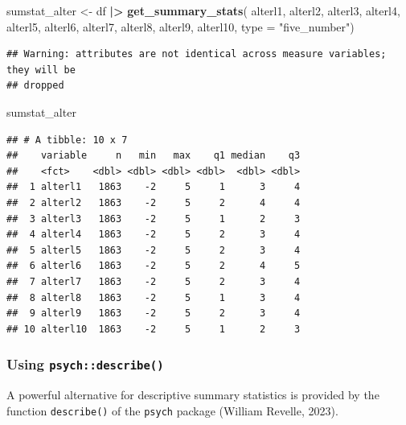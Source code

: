 \documentclass[
  doc]{apa6}
\newenvironment{Shaded}{\begin{snugshade}}{\end{snugshade}}
\newcommand{\AttributeTok}[1]{\textcolor[rgb]{0.13,0.29,0.53}{#1}}
\newcommand{\FunctionTok}[1]{\textcolor[rgb]{0.13,0.29,0.53}{\textbf{#1}}}
\newcommand{\NormalTok}[1]{#1}
\newcommand{\OtherTok}[1]{\textcolor[rgb]{0.56,0.35,0.01}{#1}}
\newcommand{\SpecialCharTok}[1]{\textcolor[rgb]{0.81,0.36,0.00}{\textbf{#1}}}
\newcommand{\StringTok}[1]{\textcolor[rgb]{0.31,0.60,0.02}{#1}}
\begin{document}
\begin{Shaded}
\begin{Highlighting}[]
\NormalTok{sumstat\_alter }\OtherTok{\textless{}{-}}\NormalTok{ df }\SpecialCharTok{|\textgreater{}} 
  \FunctionTok{get\_summary\_stats}\NormalTok{(}
\NormalTok{    alterl1, }
\NormalTok{    alterl2, }
\NormalTok{    alterl3, }
\NormalTok{    alterl4, }
\NormalTok{    alterl5, }
\NormalTok{    alterl6, }
\NormalTok{    alterl7, }
\NormalTok{    alterl8, }
\NormalTok{    alterl9, }
\NormalTok{    alterl10,  }
    \AttributeTok{type =} \StringTok{"five\_number"}\NormalTok{)  }
\end{Highlighting}
\end{Shaded}

\begin{verbatim}
## Warning: attributes are not identical across measure variables; they will be
## dropped
\end{verbatim}

\begin{Shaded}
\begin{Highlighting}[]
\NormalTok{sumstat\_alter}
\end{Highlighting}
\end{Shaded}

\begin{verbatim}
## # A tibble: 10 x 7
##    variable     n   min   max    q1 median    q3
##    <fct>    <dbl> <dbl> <dbl> <dbl>  <dbl> <dbl>
##  1 alterl1   1863    -2     5     1      3     4
##  2 alterl2   1863    -2     5     2      4     4
##  3 alterl3   1863    -2     5     1      2     3
##  4 alterl4   1863    -2     5     2      3     4
##  5 alterl5   1863    -2     5     2      3     4
##  6 alterl6   1863    -2     5     2      4     5
##  7 alterl7   1863    -2     5     2      3     4
##  8 alterl8   1863    -2     5     1      3     4
##  9 alterl9   1863    -2     5     2      3     4
## 10 alterl10  1863    -2     5     1      2     3
\end{verbatim}

\hypertarget{using-psychdescribe}{%
\subsubsection{\texorpdfstring{Using \texttt{psych::describe()}}{Using psych::describe()}}\label{using-psychdescribe}}

A powerful alternative for descriptive summary statistics is provided by the function \texttt{describe()} of the \texttt{psych} package (William Revelle, 2023).
\end{document}
